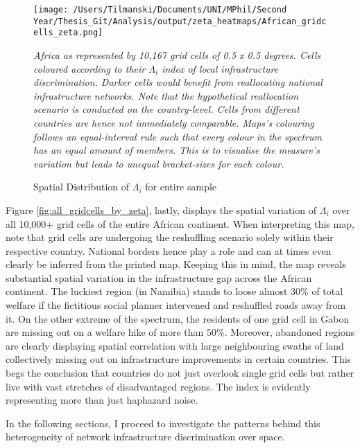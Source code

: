 \documentclass[11pt, oneside]{article}   	%
\begin{document}
\begin{figure}
\centering
\caption{Spatial Distribution of $\Lambda_{i}$ for entire sample}
\texttt{[image: /Users/Tilmanski/Documents/UNI/MPhil/Second Year/Thesis\_Git/Analysis/output/zeta\_heatmaps/African\_gridcells\_zeta.png]}

\label{fig:all_gridcells_by_zeta}
\justify
\begin{spacing}{0.7}
\textit{\footnotesize Africa as represented by 10,167 grid cells of 0.5 x 0.5 degrees. Cells coloured according to their $\Lambda_{i}$ index of local infrastructure discrimination. Darker cells would benefit from reallocating national infrastructure networks. Note that the hypothetical reallocation scenario is conducted on the country-level. Cells from different countries are hence not immediately comparable. Maps's colouring follows an equal-interval rule such that every colour in the spectrum has an equal amount of members. This is to visualise the measure's variation but leads to unequal bracket-sizes for each colour.}
\end{spacing}
\end{figure}

Figure \eqref{fig:all_gridcells_by_zeta}, lastly, displays the spatial variation of $\Lambda_{i}$ over all 10,000+ grid cells of the entire African continent. When interpreting this map, note that grid cells are undergoing the reshuffling scenario solely within their respective country. National borders hence play a role and can at times even clearly be inferred from the printed map. Keeping this in mind, the map reveals substantial spatial variation in the infrastructure gap across the African continent. The luckiest region (in Namibia) stands to loose almost 30\% of total welfare if the fictitious social planner intervened and reshuffled roads away from it. On the other extreme of the spectrum, the residents of one grid cell in Gabon are missing out on a welfare hike of more than 50\%. Moreover, abandoned regions are clearly displaying spatial correlation with large neighbouring swaths of land collectively missing out on infrastructure improvements in certain countries. This begs the conclusion that countries do not just overlook single grid cells but rather live with vast stretches of disadvantaged regions. The index is evidently representing more than just haphazard noise.

In the following sections, I proceed to investigate the patterns behind this heterogeneity of network infrastructure discrimination over space.
\end{document}
